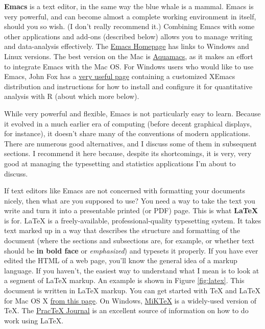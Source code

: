 \documentclass[11pt,article,oneside]{memoir}
\begin{document}
\textbf{Emacs} is a text editor, in the same way the blue whale is a mammal. Emacs is very powerful, and can become almost a complete working environment in itself, should you so wish. (I don't really recommend it.) Combining Emacs with some other applications and add-ons (described below) allows you to manage writing and data-analysis effectively. The \href{http://www.gnu.org/software/emacs/}{Emacs Homepage} has links to Windows and Linux versions. The best version on the Mac is \href{http://aquamacs.org/}{Aquamacs}, as it makes an effort to integrate Emacs with the Mac OS. For Windows users who would like to use Emacs, John Fox has a
\href{http://socserv.mcmaster.ca/jfox/Books/Companion/ESS/}{very useful page}
containing a customized XEmacs distribution and instructions for how to install and
configure it for quantitative analysis with R (about which more below).

While very powerful and flexible, Emacs is not particularly easy to learn. Because it evolved in a much  earlier era of computing (before decent graphical displays, for instance), it doesn't share many of the conventions of modern applications. There are numerous good alternatives, and I discuss some of them in subsequent sections. I recommend it here because, despite its shortcomings, it is very, very good at managing the typesetting and statistics applications I'm about to discuss.

If text editors like Emacs are not concerned with formatting your documents nicely, then what are you supposed to use? You need a way to take the text you write and turn it into a presentable printed (or PDF) page. This is what \textbf{LaTeX} is for. LaTeX is a freely-available, professional-quality typesetting system. It takes text marked up in a way that describes the structure and formatting  of the document (where the sections and subsections are, for example, or whether text should be \textbf{in bold face} or \emph{emphasized}) and typesets it properly. If you have ever edited the HTML of a web page, you'll know the general idea of a markup language. If you haven't, the easiest way to understand what I mean is to look at a segment of LaTeX markup. An example is shown in Figure \ref{fig:latex}. This document is written in LaTeX markup. You can get started with TeX and LaTeX for Mac OS X \href{http://tug.org/mactex/}{from this page}. On Windows, \href{http://www.miktex.org/}{MiKTeX} is a widely-used version of TeX. The \href{http://www.tug.org/pracjourn/}{PracTeX Journal} is an excellent source of information on how to do work using LaTeX. 
\end{document}
